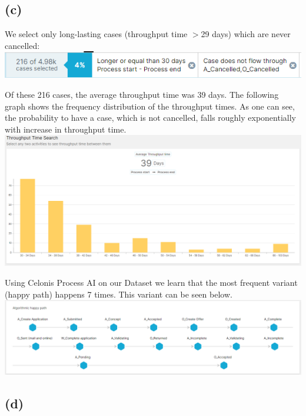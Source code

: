 \documentclass[../../main.tex]{subfiles}
\begin{document}
\subsection*{(c)}
We select only long-lasting cases (throughput time $>$29 days) which are never cancelled:
\includegraphics[width=\textwidth]{img/QUESTION_5c_selection.png}

Of these 216 cases, the average throughput time was 39 days. The following graph shows the frequency distribution of the throughput times. As one can see, the probability to have a case, which is not cancelled, falls roughly exponentially with increase in throughput time.\\
\includegraphics[width=\textwidth]{img/QUESTION_5c_throughput_time.png}

Using Celonis Process AI on our Dataset we learn that the most frequent variant (happy path) happens 7 times. This variant can be seen below.\\
\includegraphics[width=\textwidth]{img/QUESTION_5c_happy_path.png}


\subsection*{(d)}
\end{document}
